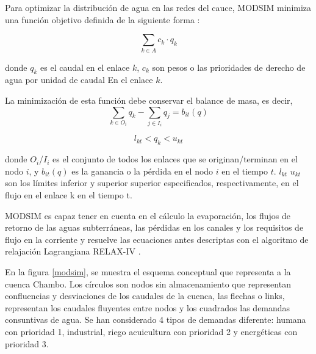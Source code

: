    Para optimizar la distribución de agua en las redes del cauce, MODSIM minimiza 
   una función objetivo definida de la siguiente forma \cite{modsim2}:

   \begin{equation}
    \sum_{k \in A}c_k\cdot q_k
   \end{equation}

   donde $q_k$ es el caudal en el enlace $k$, $c_k$ son pesos o las prioridades de derecho de agua por unidad de caudal En
   el enlace $k$. 

   La minimización de esta función debe conservar el balance de masa, es decir, 
   \begin{equation}
    \sum_{k \in O_i} q_k- \sum_{j \in I_i} q_j = b_{it}(q)
   \end{equation}

   \begin{equation}
    l_{kt} < q_k< u_{kt}
   \end{equation}

   donde $O_i$/$I_i$ es el conjunto de todos los enlaces que se originan/terminan en el nodo $i$,  
    y $b_{it}(q)$  es la ganancia o la pérdida en el nodo $i$ en el tiempo $t$. $l_{kt}$ $u_{kt}$ son los
    límites inferior y superior superior especificados, respectivamente, en el flujo en el enlace k en el tiempo t.

MODSIM es capaz tener en cuenta en el cálculo la evaporación, los flujos de retorno de las aguas subterráneas, 
las pérdidas en los canales y los requisitos de flujo en la corriente y resuelve las ecuaciones antes descriptas
con el algoritmo de relajación Lagrangiana RELAX-IV \cite{modim3}.


En la figura \ref{modsim}, se muestra el esquema conceptual que representa a la cuenca Chambo. Los círculos son
nodos sin almacenamiento que representan confluencias y desviaciones de los caudales de la cuenca,
las flechas o links, representan los caudales fluyentes entre nodos y los cuadrados las demandas consuntivas de agua.
Se han considerado 4 tipos de demandas diferente: humana con prioridad 1, industrial, riego 
acuicultura con prioridad 2 y energéticas con prioridad 3.




